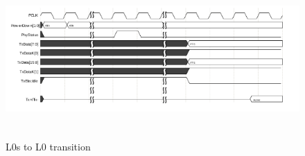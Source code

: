 \begin{itemize}
\begin{itemize}
\begin{figure}[H]
  \centering
  \includegraphics[width=130mm,height=60mm]{images/clk_diagram/l0g.png}
  \caption{ L0s to L0 transition}
  \label{lane}
\end{figure}

\end{itemize}
\end{itemize}
